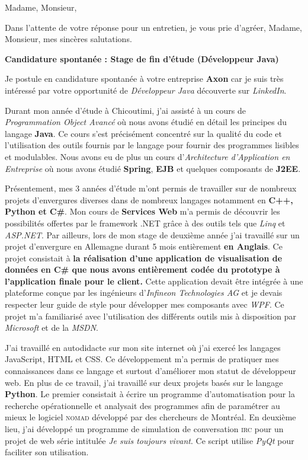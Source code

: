 \date{\today}
\opening{Madame, Monsieur,}
\closing{Dans l'attente de votre réponse pour un entretien, je vous prie d'agréer, Madame, Monsieur, mes sincères salutations.}

\makelettertitle

\textbf{Candidature spontanée : Stage de fin d'étude (Développeur Java)}

\introduction{}
Je postule en candidature spontanée à votre entreprise \textbf{Axon} car je suis très intéressé par votre opportunité de \textit{Développeur Java} découverte sur \textit{LinkedIn}.

Durant mon année d'étude à Chicoutimi, j'ai assisté à un cours de \textit{Programmation Object Avancé} où nous avons étudié en détail les principes du langage \textbf{Java}. Ce cours s'est précisément concentré sur la qualité du code et l'utilisation des outils fournis par le langage pour fournir des programmes lisibles et modulables. Nous avons eu de plus un cours d'\textit{Architecture d'Application en Entreprise} où nous avons étudié \textbf{Spring}, \textbf{EJB} et quelques composants de \textbf{J2EE}.

Présentement, mes 3 années d'étude m'ont permis de travailler sur de nombreux projets d'envergures diverses dans de nombreux langages notamment en \textbf{C++, Python et C\#}. Mon cours de \textbf{Services Web} m'a permis de découvrir les possibilités offertes par le framework .NET grâce à des outils tels que \textit{Linq} et \textit{ASP.NET}. Par ailleurs, lors de mon stage de deuxième année j'ai travaillé sur un projet d'envergure en Allemagne durant 5 mois entièrement \textbf{en Anglais}. Ce projet consistait à \textbf{la réalisation d'une application de visualisation de données en C\# que nous avons entièrement codée du prototype à l'application finale pour le client.} Cette application devait être intégrée à une plateforme conçue par les ingénieurs d'\textit{Infineon Technologies AG} et je devais respecter leur guide de style pour développer mes composants avec \textit{WPF}. Ce projet m'a familiarisé avec l'utilisation des différents outils mis à disposition par \textit{Microsoft} et de la \textit{MSDN}.

J'ai travaillé en autodidacte sur mon site internet où j'ai exercé les langages JavaScript, HTML et CSS. Ce développement m'a permis de pratiquer mes connaissances dans ce langage et surtout d'améliorer mon statut de développeur web. En plus de ce travail, j'ai travaillé sur deux projets basés sur le langage \textbf{Python}. Le premier consistait à écrire un programme d'automatisation pour la recherche opérationnelle et analysait des programmes afin de paramétrer au mieux le logiciel \textsc{nomad} développé par des chercheurs de Montréal. En deuxième lieu, j'ai développé un programme de simulation de conversation \textsc{irc} pour un projet de web série intitulée \textit{Je suis toujours vivant}. Ce script utilise \textit{PyQt} pour faciliter son utilisation. \conclusion{}

\makeletterclosing
